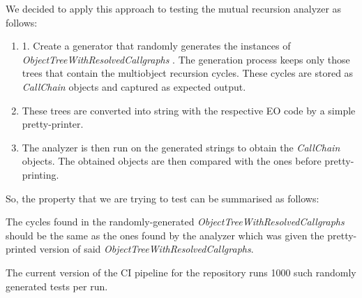 We decided to apply this approach to testing the mutual recursion analyzer as follows:
\begin{enumerate}
  \item 1. Create a generator that randomly generates the instances of \textit{ObjectTreeWithResolvedCallgraphs} . The generation process keeps only those trees that contain the multiobject recursion cycles. These cycles are stored as \textit{CallChain} objects and captured as expected output. 
  \item These trees are converted into string with the respective EO code by a simple pretty-printer.
  \item The analyzer is then run on the generated strings to obtain the \textit{CallChain} objects. The obtained objects are then compared with the ones before pretty-printing. 
\end{enumerate}

So, the property that we are trying to test can be summarised as follows: 

\begin{definition}
  The cycles found in the randomly-generated \textit{ObjectTreeWithResolvedCallgraphs} should be the same as the ones found by the analyzer which was given the pretty-printed version of said \textit{ObjectTreeWithResolvedCallgraphs}.
\end{definition}

The current version of the CI pipeline for the repository runs 1000 such randomly generated tests per run. 
